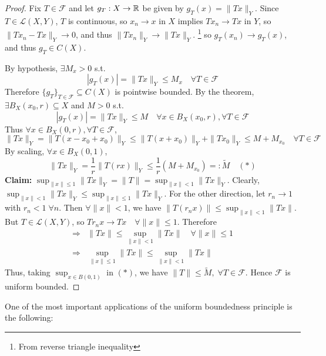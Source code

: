\begin{proof}
    Fix $T \in \mathcal{F}$ and let $g_T : X \to \mathbb{R}$ be given by $g_T(x) = \| T x \|_Y$.
    Since $T \in \mathcal{L}(X, Y)$, $T$ is continuous, so $x_n \to x$ in $X$ implies $T x_n \to T x$ in $Y$, 
    so $\| T x_n - T x \|_Y \to 0$, and thus $\| T x_n \|_Y \to \| T x \|_Y  $. \footnote{From reverse triangle inequality}
    so $g_T(x_n) \to g_T(x)$, and thus $g_T \in C(X)$. 
    
    By hypothesis, $\exists M_x > 0$ s.t. 
    \[
        | g_T(x) | = \| T x \|_Y \leq M_x \quad \forall T \in \mathcal{F} 
    \]  
    Therefore $\{g_T\}_{T \in \mathcal{F}} \subseteq C(X)$ is pointwise bounded.
    By the theorem, $\exists B_X(x_0, r) \subseteq X$ and $M > 0$ s.t. 
    \[
        | g_T(x) | = \| T x \|_Y \leq M \quad \forall x \in B_X(x_0, r), \forall T \in \mathcal{F} 
    \]    
    Thus $\forall x \in B_X(0, r), \forall T \in \mathcal{F}$, 
    \[
        \| T x \|_Y = \| T(x - x_0 + x_0) \|_Y \leq \| T(x + x_0) \|_Y + \| T x_0 \|_Y \leq M + M_{x_0} 
        \quad \forall T \in \mathcal{F}    
    \]   
    By scaling, $\forall x \in B_X(0, 1)$,
    \[
        \| T x \|_Y = \frac{1}{r} \| T(rx) \|_Y \leq \frac{1}{r}(M + M_{x_0}) = : \tilde{M} \quad (*)  
    \]  
    \noindent \textbf{Claim:} $\sup_{\| x \| \leq 1} \| T x \|_Y = \| T \| = \sup_{ \| x \| < 1 } \| T x \|_Y$.
    \newline \noindent Clearly, $\sup_{\| x \| < 1 } \| T x \|_Y \leq \sup_{\| x \| \leq 1} \| T x \|_Y$.
    For the other direction, let $r_n \to 1$ with $r_n < 1 \; \forall n$. Then $\forall \| x \| < 1$,
    we have $\| T(r_n x) \| \leq \sup_{\| x \|< 1 } \| T x \|  $. But $T \in \mathcal{L}(X, Y)$, so
    $Tr_n x \to T x \quad \forall \| x \| \leq 1 $. Therefore
    \begin{align*}
        \Rightarrow& \| T x \| \leq \sup_{ \| x \| < 1 } \| T x \|  \quad \forall \| x \| \leq 1 \\
        \Rightarrow& \sup_{\| x \| \leq 1} \| T x \| \leq \sup_{ \| x \| < 1 } \| T x \|
    \end{align*}         
    Thus, taking $\sup_{x \in B(0, 1)}$ in $(*)$, we have $\| T \| \leq \tilde{M}, \; \forall T \in \mathcal{F} $.
    Hence $\mathcal{F}$ is uniform bounded. \qedhere    
\end{proof}

One of the most important applications of the uniform boundedness principle is the following:

